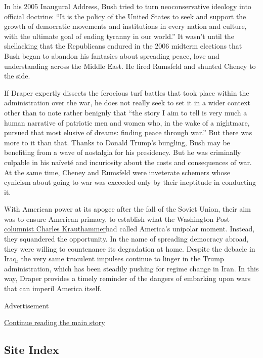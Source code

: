 In his 2005 Inaugural Address, Bush tried to turn neoconservative
ideology into official doctrine: ``It is the policy of the United States
to seek and support the growth of democratic movements and institutions
in every nation and culture, with the ultimate goal of ending tyranny in
our world.'' It wasn't until the shellacking that the Republicans
endured in the 2006 midterm elections that Bush began to abandon his
fantasies about spreading peace, love and understanding across the
Middle East. He fired Rumsfeld and shunted Cheney to the side.

If Draper expertly dissects the ferocious turf battles that took place
within the administration over the war, he does not really seek to set
it in a wider context other than to note rather benignly that ``the
story I aim to tell is very much a human narrative of patriotic men and
women who, in the wake of a nightmare, pursued that most elusive of
dreams: finding peace through war.'' But there was more to it than that.
Thanks to Donald Trump's bungling, Bush may be benefiting from a wave of
nostalgia for his presidency. But he was criminally culpable in his
naïveté and incuriosity about the costs and consequences of war. At the
same time, Cheney and Rumsfeld were inveterate schemers whose cynicism
about going to war was exceeded only by their ineptitude in conducting
it.

With American power at its apogee after the fall of the Soviet Union,
their aim was to ensure American primacy, to establish what the
Washington Post
\href{https://www.nytimes.com/2018/06/21/obituaries/charles-krauthammer-prominent-conservative-voice-dies-at-68.html}{columnist
Charles Krauthammer}had called America's unipolar moment. Instead, they
squandered the opportunity. In the name of spreading democracy abroad,
they were willing to countenance its degradation at home. Despite the
debacle in Iraq, the very same truculent impulses continue to linger in
the Trump administration, which has been steadily pushing for regime
change in Iran. In this way, Draper provides a timely reminder of the
dangers of embarking upon wars that can imperil America itself.

Advertisement

\protect\hyperlink{after-bottom}{Continue reading the main story}

\hypertarget{site-index}{%
\subsection{Site Index}\label{site-index}}

